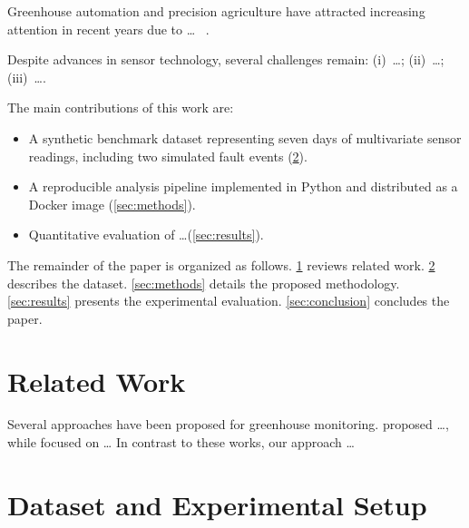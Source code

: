 \documentclass[preprint,12pt,authoryear]{elsarticle}
\begin{document}

Greenhouse automation and precision agriculture have attracted
increasing attention in recent years due to \ldots
~\citep{Ref1}.

Despite advances in sensor technology, several challenges remain:
(i)~\ldots; (ii)~\ldots; (iii)~\ldots.

The main contributions of this work are:
\begin{itemize}
  \item A synthetic benchmark dataset representing seven days of
        multivariate sensor readings, including two simulated fault
        events (\cref{sec:data}).
  \item A reproducible analysis pipeline implemented in Python and
        distributed as a Docker image (\cref{sec:methods}).
  \item Quantitative evaluation of \ldots (\cref{sec:results}).
\end{itemize}

The remainder of the paper is organized as follows.
\cref{sec:related} reviews related work.
\cref{sec:data} describes the dataset.
\cref{sec:methods} details the proposed methodology.
\cref{sec:results} presents the experimental evaluation.
\cref{sec:conclusion} concludes the paper.

\section{Related Work}
\label{sec:related}


Several approaches have been proposed for greenhouse monitoring.
\citet{Ref2} proposed \ldots, while \citet{Ref3} focused on \ldots
In contrast to these works, our approach \ldots

\section{Dataset and Experimental Setup}
\label{sec:data}

\end{document}
